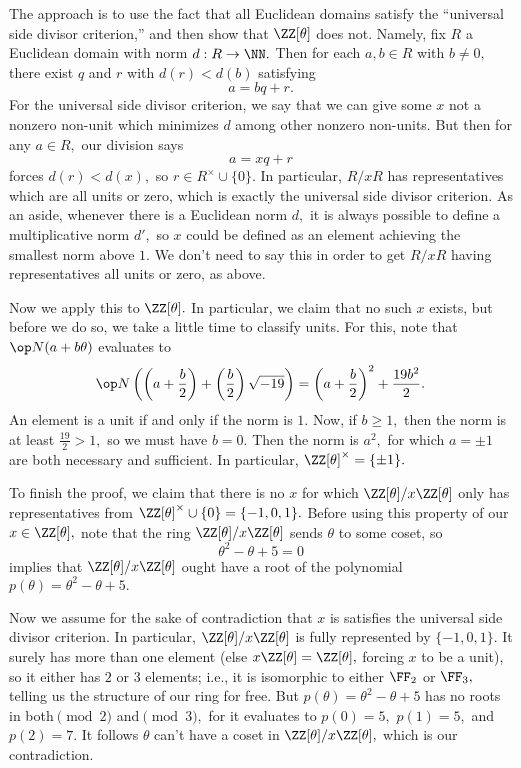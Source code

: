 The approach is to use the fact that all Euclidean domains satisfy the ``universal side divisor criterion,'' and then show that $\ZZ[\theta]$ does not. Namely, fix $R$ a Euclidean domain with norm $d:R\to\NN.$ Then for each $a,b\in R$ with $b\ne0,$ there exist $q$ and $r$ with $d(r)<d(b)$ satisfying
\[a=bq+r.\]
For the universal side divisor criterion, we say that we can give some $x$ not a nonzero non-unit which minimizes $d$ among other nonzero non-units. But then for any $a\in R,$ our division says
\[a=xq+r\]
forces $d(r)<d(x),$ so $r\in R^\times\cup\{0\}.$ In particular, $R/xR$ has representatives which are all units or zero, which is exactly the universal side divisor criterion. As an aside, whenever there is a Euclidean norm $d,$ it is always possible to define a multiplicative norm $d',$ so $x$ could be defined as an element achieving the smallest norm above $1.$ We don't need to say this in order to get $R/xR$ having representatives all units or zero, as above.

Now we apply this to $\ZZ[\theta].$ In particular, we claim that no such $x$ exists, but before we do so, we take a little time to classify units. For this, note that $\op N(a+b\theta)$ evaluates to
\[\op N\left(\left(a+\frac b2\right)+\left(\frac b2\right)\sqrt{-19}\right)=\left(a+\frac b2\right)^2+\frac{19b^2}2.\]
An element is a unit if and only if the norm is $1.$ Now, if $b\ge1,$ then the norm is at least $\frac{19}2>1,$ so we must have $b=0.$ Then the norm is $a^2,$ for which $a=\pm 1$ are both necessary and sufficient. In particular, $\ZZ[\theta]^\times=\{\pm1\}.$

To finish the proof, we claim that there is no $x$ for which $\ZZ[\theta]/x\ZZ[\theta]$ only has representatives from $\ZZ[\theta]^\times\cup\{0\}=\{-1,0,1\}.$ Before using this property of our $x\in\ZZ[\theta],$ note that the ring $\ZZ[\theta]/x\ZZ[\theta]$ sends $\theta$ to some coset, so
\[\theta^2-\theta+5=0\]
implies that $\ZZ[\theta]/x\ZZ[\theta]$ ought have a root of the polynomial $p(\theta)=\theta^2-\theta+5.$

Now we assume for the sake of contradiction that $x$ is satisfies the universal side divisor criterion. In particular, $\ZZ[\theta]/x\ZZ[\theta]$ is fully represented by $\{-1,0,1\}.$ It surely has more than one element (else $x\ZZ[\theta]=\ZZ[\theta],$ forcing $x$ to be a unit), so it either has $2$ or $3$ elements; i.e., it is isomorphic to either $\FF_2$ or $\FF_3,$ telling us the structure of our ring for free. But $p(\theta)=\theta^2-\theta+5$ has no roots in both$\pmod2$ and$\pmod3,$ for it evaluates to $p(0)=5,$ $p(1)=5,$ and $p(2)=7.$ It follows $\theta$ can't have a coset in $\ZZ[\theta]/x\ZZ[\theta],$ which is our contradiction.


